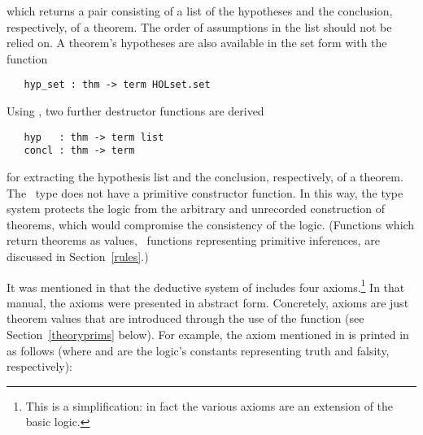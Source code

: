 \noindent which returns a pair consisting of a list of the
hypotheses
and the conclusion,
%
respectively, of a theorem.  The order of assumptions in the list
should not be relied on.  A theorem's hypotheses are also available in
the set form with the function

\begin{holboxed}
\begin{verbatim}
   hyp_set : thm -> term HOLset.set
\end{verbatim}
\end{holboxed}

Using , two further destructor
functions are derived

\begin{holboxed}
\begin{verbatim}
   hyp   : thm -> term list
   concl : thm -> term
\end{verbatim}
\end{holboxed}

\noindent for extracting the hypothesis list and the conclusion, respectively,
of a theorem. The \ML\ type  does not have
a primitive constructor function.  In this way, the \ML{} type system protects
the \HOL{} logic
from the arbitrary and unrecorded construction
of theorems, which would compromise
the consistency
 of the logic.
(Functions which return theorems as values, \eg\ functions representing primitive inferences,
are discussed in Section~\ref{rules}.)

It was mentioned in \LOGIC{} that the deductive system of \HOL{}
includes four axioms.\footnote{This is a simplification: in fact the
  various axioms are an extension of the basic logic.}  In that
manual, the axioms were presented in abstract form.  Concretely,
axioms are just theorem values that are introduced through the use of
the \ML{} function  (see Section~\ref{theoryprims}
below).  For example, the axiom  mentioned in
\LOGIC{} is printed in \HOL{} as follows (where  and
 are the \HOL{} logic's constants representing truth and
falsity, respectively):

